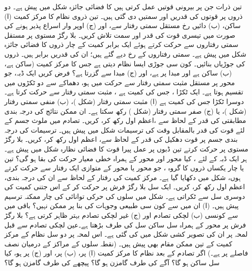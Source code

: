 تین ذرات جن پر بیرونی قوتیں عمل کرتی ہیں  کا فضائی جائزہ  شکل   میں  پیش  ہے۔ دو ذروں پر قوتوں کی قدریں اور سمتیں دی گئی ہیں۔ تین ذروی نظام  کا مرکز کمیت (ا) ساکن، (ب) دائیں رخ مستقل  سمتی رفتار سے، اور (ج) اوپر وار اسراع پذیر ہونے کی صورت میں تیسری قوت کی قدر اور سمت تلاش کریں۔
بلا رگڑ  مستوی  پر مستقل سمتی   رفتاروں سے  حرکت کرتے  ہوئے ایک برابر کمیت کے چار ذروں کا فضائی جائزہ    شکل  میں پیش ہے۔ سمتی رفتاروں کے رخ دیے گئے ہیں؛ ان کی قدریں برابر ہیں۔ ذروں کی جوڑیاں بنائیں۔ کون  سی جوڑی  ایسا نظام دیتی ہے جس کا مرکز کمیت (ساکن ہے، (ب)  ساکن ہے اور مبدا پر ہے، اور (ج) مبدا سے گزرتا ہے؟
فرض کریں ایک ڈبہ،   جو  محور پر  مستقل   مثبت سمتی رفتار سے حرکت میں ہو، دھماکے سے دو  ٹکڑوں  میں تقسیم ہوتا ہے۔  ایک  ٹکڑا ، جس کی کمیت  ہے ،  مثبت سمتی رفتار   سے حرکت کرتا ہے۔ دوسرا ٹکڑا جس کی کمیت  ہے  (ا)  مثبت سمتی رفتار    (شکل )، (ب) منفی سمتی رفتار  (شکل )، یا (ج)  صفر سمتی رفتار  (شکل ) رکھ سکتا ہے۔  ان ممکن نتائج کی درجہ بندی  مطابقتی  کی قدر  کے لحاظ سے ،اعظم اول  رکھ کر، کریں۔ 
تصادم میں ملوث  جسم کے لئے  قوت کی قدر بالمقابل وقت کی ترسیمات شکل  میں پیش ہیں۔ ترسیمات کی درجہ بندی  جسم پر قوت دھکیل کی قدر  کے لحاظ سے، اعظم اول رکھ کر،  کریں۔
بلا رگڑ مستوی پر حرکت کرتے    تین ڈبوں پر عمل پیرا قوت  کا  فضائی نظارہ شکل  میں پیش ہے۔ ہر ایک ڈبہ کے لئے ،  کیا   محور  اور محور  کے ہمراہ خطی معیار حرکت کی بقا ہو گی؟
تین یا  چار یکساں ذروں کا گروہ ، جو محور  یا محور  کے متوازی  ایک رفتار سے حرکت کرتے ہوں، شکل  میں دکھایا گیا ہے۔ مرکز کمیت کی رفتار کے لحاظ سے ان کی درجہ بندی، اعظم اول رکھ کر،  کریں۔
ایک سل بلا رگڑ فرش  پر حرکت کر کے اس جتنی کمیت کی دوسری سل سے  ٹکراتی ہے۔ شکل  میں سلوں کی حرکی توانائی   کی چار  ممکنہ ترسیم  پیش ہیں۔ (ا) ان میں سے کون سی طبیعی  وجوہات کی بنا پر  ممکن نہیں؟ باقی میں سے  کونسی (ب) لچکی تصادم اور (ج) غیر لچکی تصادم بہتر ظاہر کرتی ہے؟
بلا رگڑ فرش پر محور  کے ہمراہ   سل     ساکن  سل  کی طرف بڑھتا ہے۔عین لچکی تصادم سے  قبل لمحہ پر   ان کی تصویر کشی شکل  میں  کی گئی  ہے۔ اس لمحہ پر دو  سل نظام کے مرکز کمیت کے تین ممکن مقام بھی پیش  ہیں۔ (نقطہ      سلوں کے مراکز کے  درمیان  نصف فاصلے پر ہے۔)  اگر  تصادم کے بعد نظام کا مرکز کمیت  (ا)  پر، (ب)  پر، اور (ج)  پر ہو، کیا سل  ساکن  ہو گا؟ آگے  کی طرف گامزن ہو گا؟     پیچھے کی طرف گامزن ہو گا؟
